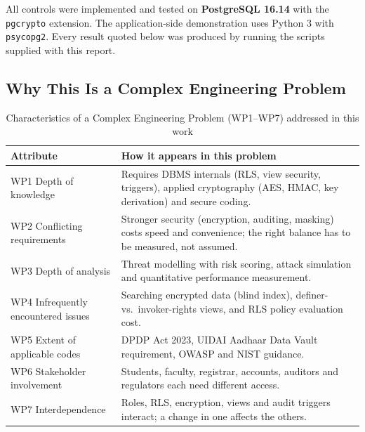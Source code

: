 \documentclass[11pt,a4paper]{report}
\begin{document}
All controls were implemented and tested on \textbf{PostgreSQL 16.14} with the \texttt{pgcrypto} extension. The application-side demonstration uses Python 3 with \texttt{psycopg2}. Every result quoted below was produced by running the scripts supplied with this report.

\subsection{Why This Is a Complex Engineering Problem}
\begin{table}[H]
    \centering
    \caption{Characteristics of a Complex Engineering Problem (WP1--WP7) addressed in this work}
    \small
    \begin{tabularx}{\textwidth}{|l|Y|}
        \hline
        \textbf{Attribute} & \textbf{How it appears in this problem} \\ \hline
        WP1 Depth of knowledge & Requires DBMS internals (RLS, view security, triggers), applied cryptography (AES, HMAC, key derivation) and secure coding. \\ \hline
        WP2 Conflicting requirements & Stronger security (encryption, auditing, masking) costs speed and convenience; the right balance has to be measured, not assumed. \\ \hline
        WP3 Depth of analysis & Threat modelling with risk scoring, attack simulation and quantitative performance measurement. \\ \hline
        WP4 Infrequently encountered issues & Searching encrypted data (blind index), definer- vs.\ invoker-rights views, and RLS policy evaluation cost. \\ \hline
        WP5 Extent of applicable codes & DPDP Act 2023, UIDAI Aadhaar Data Vault requirement, OWASP and NIST guidance. \\ \hline
        WP6 Stakeholder involvement & Students, faculty, registrar, accounts, auditors and regulators each need different access. \\ \hline
        WP7 Interdependence & Roles, RLS, encryption, views and audit triggers interact; a change in one affects the others. \\ \hline
    \end{tabularx}
\end{table}
\end{document}
